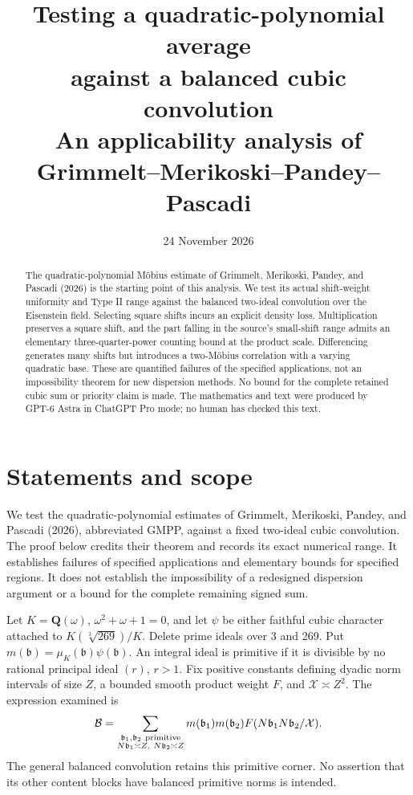 \documentclass[11pt]{article}
\title{Testing a quadratic-polynomial average\\against a balanced cubic convolution\\
\large An applicability analysis of Grimmelt--Merikoski--Pandey--Pascadi}
\author{}
\date{24 November 2026}
\begin{document}
\maketitle
\begin{abstract}
The quadratic-polynomial Möbius estimate of Grimmelt, Merikoski,
Pandey, and Pascadi (2026) is the starting point of this analysis.
We test its actual shift-weight uniformity and Type II range against
the balanced two-ideal convolution over the Eisenstein field.
Selecting square shifts incurs an explicit density loss.
Multiplication preserves a square shift, and the part falling
in the source's small-shift range admits an elementary
three-quarter-power counting bound at the product scale.
Differencing generates many shifts but introduces a two-Möbius
correlation with a varying quadratic base. These are quantified
failures of the specified applications, not an impossibility
theorem for new dispersion methods. No bound for the complete
retained cubic sum or priority claim is made.
The mathematics and text were produced by GPT-6 Astra in ChatGPT Pro
mode; no human has checked this text.
\end{abstract}

\section{Statements and scope}
We test the quadratic-polynomial estimates of Grimmelt, Merikoski,
Pandey, and Pascadi (2026), abbreviated GMPP, against a fixed
two-ideal cubic convolution. The proof below credits their theorem
and records its exact numerical range. It establishes failures of
specified applications and elementary bounds for specified regions.
It does not establish the impossibility of a redesigned dispersion
argument or a bound for the complete remaining signed sum.

Let \(K=\mathbf Q(\omega)\), \(\omega^2+\omega+1=0\), and let
\(\psi\) be either faithful cubic character attached to
\(K(\sqrt[3]{269})/K\). Delete prime ideals over 3 and 269.
Put \(m(\mathfrak b)=\mu_K(\mathfrak b)\psi(\mathfrak b)\).
An integral ideal is primitive if it is divisible by no rational
principal ideal \((r)\), \(r>1\).
Fix positive constants defining dyadic norm intervals of size \(Z\),
a bounded smooth product weight \(F\), and \(\mathcal X\asymp Z^2\).
The expression examined is
\[
 \mathcal B=\sum_{\substack{\mathfrak b_1,\mathfrak b_2\ {\rm primitive}\\
                    N\mathfrak b_1\asymp Z,\ N\mathfrak b_2\asymp Z}}
 m(\mathfrak b_1)m(\mathfrak b_2)
 F(N\mathfrak b_1N\mathfrak b_2/\mathcal X).
\]
The general balanced convolution retains this primitive corner.
No assertion that its other content blocks have balanced primitive
norms is intended.
\end{document}

